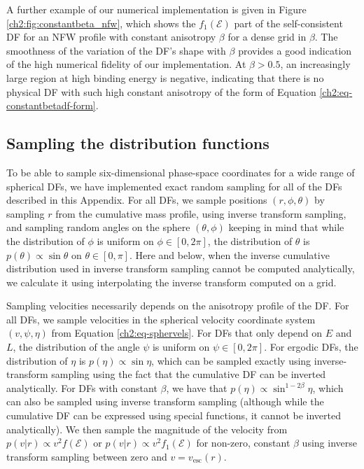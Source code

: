 A further example of our numerical implementation is given in Figure \ref{ch2:fig:constantbeta_nfw}, which shows the $f_1(\mathcal{E})$ part of the self-consistent DF for an NFW profile with constant anisotropy $\beta$ for a dense grid in $\beta$. The smoothness of the variation of the DF's shape with $\beta$ provides a good indication of the high numerical fidelity of our implementation. At $\beta > 0.5$, an increasingly large region at high binding energy is negative, indicating that there is no physical DF with such high constant anisotropy of the form of Equation \eqref{ch2:eq-constantbetadf-form}.

\subsection{Sampling the distribution functions}

To be able to sample six-dimensional phase-space coordinates for a wide range of spherical DFs, we have implemented exact random sampling for all of the DFs described in this Appendix. For all DFs, we sample positions $(r,\phi,\theta)$ by sampling $r$ from the cumulative mass profile, using inverse transform sampling, and sampling random angles on the sphere $(\theta,\phi)$ keeping in mind that while the distribution of $\phi$ is uniform on $ \phi \in [0,2\pi]$, the distribution of $\theta$ is $p(\theta)\propto \sin \theta$ on $\theta \in [0,\pi]$. Here and below, when the inverse cumulative distribution used in inverse transform sampling cannot be computed analytically, we calculate it using interpolating the inverse transform computed on a grid.

Sampling velocities necessarily depends on the anisotropy profile of the DF. For all DFs, we sample velocities in the spherical velocity coordinate system $(v,\psi,\eta)$ from Equation \eqref{ch2:eq-sphervels}. For DFs that only depend on $E$ and $L$, the distribution of the angle $\psi$ is uniform on $\psi \in [0,2\pi]$. For ergodic DFs, the distribution of $\eta$ is $p(\eta) \propto \sin \eta$, which can be sampled exactly using inverse-transform sampling using the fact that the cumulative DF can be inverted analytically. For DFs with constant $\beta$, we have that $p(\eta) \propto \sin^{1-2\beta}\eta$, which can also be sampled using inverse transform sampling (although while the cumulative DF can be expressed using special functions, it cannot be inverted analytically). We then sample the magnitude of the velocity from $p(v|r) \propto v^2 f(\mathcal{E})$ or $p(v|r) \propto v^2 f_1(\mathcal{E})$ for non-zero, constant $\beta$ using inverse transform sampling between zero and $v = v_{\mathrm{esc}}(r)$.

